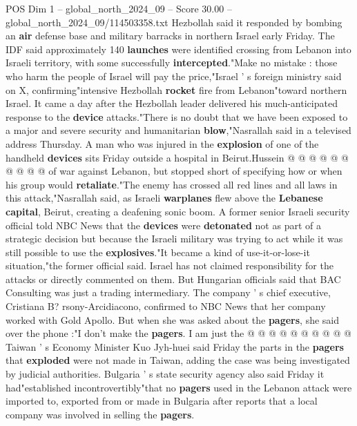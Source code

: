 \begin{textsample}{POS Dim 1 – global\_north\_2024\_09 – Score 30.00 – global\_north\_2024\_09/114503358.txt}
Hezbollah said it responded by bombing an \textbf{air} defense base and military barracks in northern Israel early Friday.
The IDF said approximately 140 \textbf{launches} were identified crossing from Lebanon into Israeli territory, with some successfully \textbf{intercepted}."Make no mistake : those who harm the people of Israel will pay the price,"Israel ' s foreign ministry said on X, confirming"intensive Hezbollah \textbf{rocket} fire from Lebanon"toward northern Israel.
It came a day after the Hezbollah leader delivered his much-anticipated response to the \textbf{device} attacks."There is no doubt that we have been exposed to a major and severe security and humanitarian \textbf{blow},"Nasrallah said in a televised address Thursday.
A man who was injured in the \textbf{explosion} of one of the handheld \textbf{devices} sits Friday outside a hospital in Beirut.Hussein @ @ @ @ @ @ @ @ @ @ of war against Lebanon, but stopped short of specifying how or when his group would \textbf{retaliate}."The enemy has crossed all red lines and all laws in this attack,"Nasrallah said, as Israeli \textbf{warplanes} flew above the \textbf{Lebanese} \textbf{capital}, Beirut, creating a deafening sonic boom.
A former senior Israeli security official told NBC News that the \textbf{devices} were \textbf{detonated} not as part of a strategic decision but because the Israeli military was trying to act while it was still possible to use the \textbf{explosives}."It became a kind of use-it-or-lose-it situation,"the former official said.
Israel has not claimed responsibility for the attacks or directly commented on them.
But Hungarian officials said that BAC Consulting was just a trading intermediary.
The company ' s chief executive, Cristiana B? rsony-Arcidiacono, confirmed to NBC News that her company worked with Gold Apollo.
But when she was asked about the \textbf{pagers}, she said over the phone :"I don't make the \textbf{pagers}.
I am just the @ @ @ @ @ @ @ @ @ @ Taiwan ' s Economy Minister Kuo Jyh-huei said Friday the parts in the \textbf{pagers} that \textbf{exploded} were not made in Taiwan, adding the case was being investigated by judicial authorities.
Bulgaria ' s state security agency also said Friday it had"established incontrovertibly"that no \textbf{pagers} used in the Lebanon attack were imported to, exported from or made in Bulgaria after reports that a local company was involved in selling the \textbf{pagers}.

\end{textsample}
